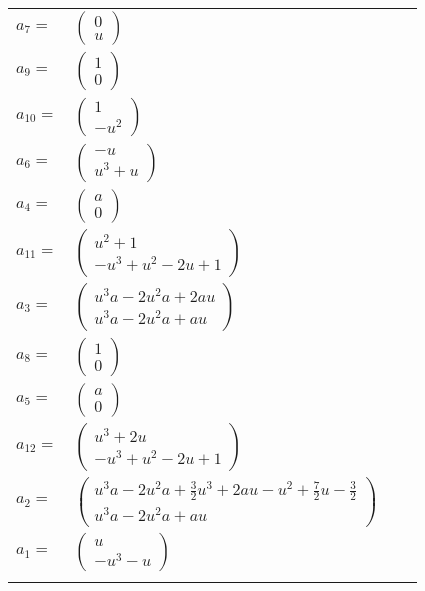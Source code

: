 \documentclass[1p]{elsarticle_modified}
\theoremstyle{definition}
\begin{document}
\begin{tabular}{m{7pt} m{180pt} m{7pt} m{180pt} }
\flushright $a_{7}=$&$\begin{pmatrix}0\\u\end{pmatrix}$ \\
\flushright $a_{9}=$&$\begin{pmatrix}1\\0\end{pmatrix}$ \\
\flushright $a_{10}=$&$\begin{pmatrix}1\\- u^2\end{pmatrix}$ \\
\flushright $a_{6}=$&$\begin{pmatrix}- u\\u^3+u\end{pmatrix}$ \\
\flushright $a_{4}=$&$\begin{pmatrix}a\\0\end{pmatrix}$ \\
\flushright $a_{11}=$&$\begin{pmatrix}u^2+1\\- u^3+u^2-2 u+1\end{pmatrix}$ \\
\flushright $a_{3}=$&$\begin{pmatrix}u^3 a-2 u^2 a+2 a u\\u^3 a-2 u^2 a+a u\end{pmatrix}$ \\
\flushright $a_{8}=$&$\begin{pmatrix}1\\0\end{pmatrix}$ \\
\flushright $a_{5}=$&$\begin{pmatrix}a\\0\end{pmatrix}$ \\
\flushright $a_{12}=$&$\begin{pmatrix}u^3+2 u\\- u^3+u^2-2 u+1\end{pmatrix}$ \\
\flushright $a_{2}=$&$\begin{pmatrix}u^3 a-2 u^2 a+\frac{3}{2} u^3+2 a u- u^2+\frac{7}{2} u-\frac{3}{2}\\u^3 a-2 u^2 a+a u\end{pmatrix}$ \\
\flushright $a_{1}=$&$\begin{pmatrix}u\\- u^3- u\end{pmatrix}$\\&\end{tabular}
\end{document}
